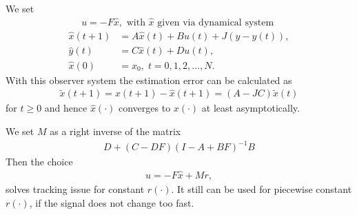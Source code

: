 We set 
\begin{align}
u= -F \hat{x}, \text{ with } \hat{x} \text{ given via dynamical system }
\end{align}
\begin{align}
\hat{x}(t+1) &= A\hat{x}(t) + B u(t) + J (y - \hat{y}(t)), \\
\hat{y}(t) & = C\hat{x}(t) + D u(t), \\
\hat{x}(0)& = x_0, \; t = 0,1,2, \dots , N.
\end{align}
With this observer system the estimation error can be calculated as \begin{align}
\tilde{x}(t+1) = x(t+1) - \hat{x}(t+1) = (A - JC) \tilde{x}(t)
\end{align} for $t \geq 0$ and hence $\hat{x} (\cdot)$ converges to $x(\cdot)$ at least asymptotically. 

We set $M$ as a right inverse of the matrix 
\begin{align}
D + (C - D F) (I - A + B F)^{-1} B
\end{align}
Then the choice
\begin{align}
u = -F\hat{x} + Mr, 
\end{align}
solves tracking issue for constant $r(\cdot)$. It still can be used for piecewise constant $r(\cdot)$, if the signal does not change too fast.















 
 
 









